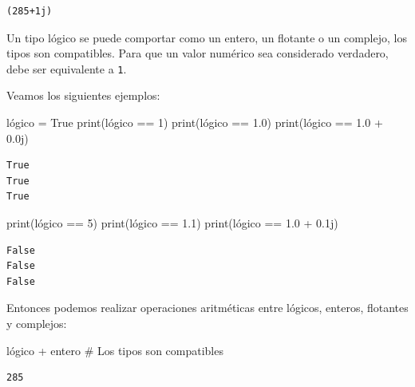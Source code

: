 \documentclass[
  spanish,
  letterpaper,
]{scrbook}
\newenvironment{Shaded}{\begin{snugshade}}{\end{snugshade}}
\newcommand{\BuiltInTok}[1]{\textcolor[rgb]{0.00,0.23,0.31}{#1}}
\newcommand{\CommentTok}[1]{\textcolor[rgb]{0.37,0.37,0.37}{#1}}
\newcommand{\DecValTok}[1]{\textcolor[rgb]{0.68,0.00,0.00}{#1}}
\newcommand{\FloatTok}[1]{\textcolor[rgb]{0.68,0.00,0.00}{#1}}
\newcommand{\NormalTok}[1]{\textcolor[rgb]{0.00,0.23,0.31}{#1}}
\newcommand{\OperatorTok}[1]{\textcolor[rgb]{0.37,0.37,0.37}{#1}}
\newcommand{\OtherTok}[1]{\textcolor[rgb]{0.00,0.23,0.31}{#1}}
\newcommand{\VariableTok}[1]{\textcolor[rgb]{0.07,0.07,0.07}{#1}}
\theoremstyle{definition}
\theoremstyle{remark}
\begin{document}
\begin{verbatim}
(285+1j)
\end{verbatim}

Un tipo lógico se puede comportar como un entero, un flotante o un
complejo, los tipos son compatibles. Para que un valor numérico sea
considerado verdadero, debe ser equivalente a \texttt{1}.

Veamos los siguientes ejemplos:

\begin{Shaded}
\begin{Highlighting}[]
\NormalTok{lógico }\OperatorTok{=} \VariableTok{True} 
\BuiltInTok{print}\NormalTok{(lógico }\OperatorTok{==} \DecValTok{1}\NormalTok{)}
\BuiltInTok{print}\NormalTok{(lógico }\OperatorTok{==} \FloatTok{1.0}\NormalTok{)}
\BuiltInTok{print}\NormalTok{(lógico }\OperatorTok{==} \FloatTok{1.0} \OperatorTok{+} \OtherTok{0.0j}\NormalTok{)}
\end{Highlighting}
\end{Shaded}

\begin{verbatim}
True
True
True
\end{verbatim}

\begin{Shaded}
\begin{Highlighting}[]
\BuiltInTok{print}\NormalTok{(lógico }\OperatorTok{==} \DecValTok{5}\NormalTok{)}
\BuiltInTok{print}\NormalTok{(lógico }\OperatorTok{==} \FloatTok{1.1}\NormalTok{)}
\BuiltInTok{print}\NormalTok{(lógico }\OperatorTok{==} \FloatTok{1.0} \OperatorTok{+} \OtherTok{0.1j}\NormalTok{)}
\end{Highlighting}
\end{Shaded}

\begin{verbatim}
False
False
False
\end{verbatim}

Entonces podemos realizar operaciones aritméticas entre lógicos,
enteros, flotantes y complejos:

\begin{Shaded}
\begin{Highlighting}[]
\NormalTok{lógico }\OperatorTok{+}\NormalTok{ entero }\CommentTok{\# Los tipos son compatibles}
\end{Highlighting}
\end{Shaded}

\begin{verbatim}
285
\end{verbatim}
\end{document}
